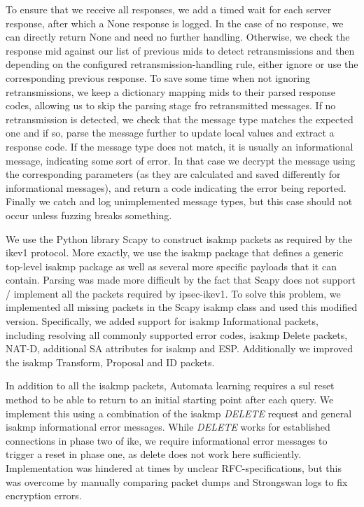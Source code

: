 To ensure that we receive all responses, we add a timed wait for each server response, after which a None response is logged. In the case of no response, we can directly return None and need no further handling. Otherwise, we check the response \ac{mid} against our list of previous \ac{mid}s to detect retransmissions and then depending on the configured retransmission-handling rule, either ignore or use the corresponding previous response. To save some time when not ignoring retransmissions, we keep a dictionary mapping \ac{mid}s to their parsed response codes, allowing us to skip the parsing stage fro retransmitted messages. If no retransmission is detected, we check that the message type matches the expected one and if so, parse the message further to update local values and extract a response code. If the message type does not match, it is usually an informational message, indicating some sort of error. In that case we decrypt the message using the corresponding parameters (as they are calculated and saved differently for informational messages), and return a code indicating the error being reported. Finally we catch and log unimplemented message types, but this case should not occur unless fuzzing breaks something.


We use the Python library Scapy to construct \ac{isakmp} packets as required by the \ac{ike}v1 protocol. More exactly, we use the \ac{isakmp} package that defines a generic top-level \ac{isakmp} package as well as several more specific payloads that it can contain. Parsing was made more difficult by the fact that Scapy does not support / implement all the packets required by \ac{ipsec}-\ac{ike}v1. To solve this problem, we implemented all missing packets in the Scapy \ac{isakmp} class and used this modified version. Specifically, we added support for \ac{isakmp} Informational packets, including resolving all commonly supported error codes, \ac{isakmp} Delete packets, NAT-D, additional SA attributes for \ac{isakmp} and ESP. Additionally we improved the \ac{isakmp} Transform, Proposal and ID packets. 

In addition to all the \ac{isakmp} packets, Automata learning requires a \ac{sul} reset method to be able to return to an initial starting point after each query. We implement this using a combination of the \ac{isakmp} \emph{DELETE} request and general \ac{isakmp} informational error messages. While \emph{DELETE} works for established connections in phase two of \ac{ike}, we require informational error messages to trigger a reset in phase one, as delete does not work here sufficiently. Implementation was hindered at times by unclear RFC-specifications, but this was overcome by manually comparing packet dumps and Strongswan logs to fix encryption errors.\\

